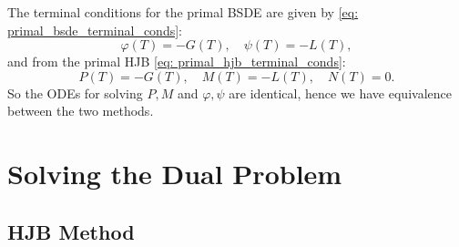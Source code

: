 The terminal conditions for the primal BSDE are given by \eqref{eq: primal_bsde_terminal_conds}:
\begin{equation*}
    \varphi(T) = - G(T), \quad \psi(T) = - L(T),
\end{equation*}
and from the primal HJB \eqref{eq: primal_hjb_terminal_conds}:
\begin{equation*}
    P(T) = -G(T), \quad M(T) = - L(T), \quad N(T) = 0. 
\end{equation*}
So the ODEs for solving $P, M$ and $\varphi, \psi$ are identical, hence we have equivalence between the two methods.


\newpage

\section{Solving the Dual Problem}


\subsection{HJB Method}\label{Dual HJB Equation}
